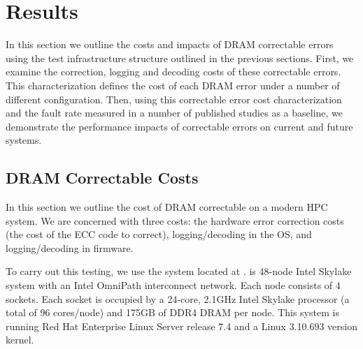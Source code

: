 
\section{Results}
\label{sec:results}

In this section we outline the costs and impacts of DRAM correctable errors
using the test infrastructure structure outlined in the previous sections.  First,
we examine the correction, logging and decoding costs of these correctable
errors.  This characterization defines the cost of each DRAM error under a number
of different configuration.  Then, using this correctable error cost
characterization and the fault rate measured in a number of published studies as
a baseline, we demonstrate the performance impacts of correctable errors on
current and future systems.

\subsection{DRAM Correctable Costs}
\label{sec:results:dram_correctable}

In this section we outline the cost of DRAM correctable on a modern HPC system.
We are concerned with three costs: the hardware error correction costs (the cost
of the ECC code to correct), logging/decoding in the OS, and logging/decoding in
firmware.

To carry out this testing, we use the \blake system located at .  \blake is 48-node Intel Skylake system with an 
Intel OmniPath interconnect network.  Each node consists of 4 sockets.  Each 
socket is occupied by a 24-core, 2.1GHz Intel
Skylake processor (a total of 96 cores/node) and 175GB of DDR4 DRAM per node.
This system is running Red Hat Enterprise Linux Server release 7.4 and a Linux
3.10.693 version kernel.



